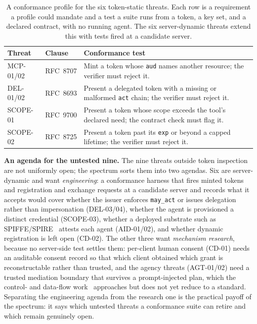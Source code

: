 \begin{table}[t]
\centering\footnotesize
\caption{A conformance profile for the six token-static threats. Each row is a
requirement a profile could mandate and a test a suite runs from a token, a key set,
and a declared contract, with no running agent. The six server-dynamic threats extend
this with tests fired at a candidate server.}
\label{tab:conformance}
\begin{tabular}{@{}llp{3.3cm}@{}}
\toprule
Threat & Clause & Conformance test \\
\midrule
MCP-01/02 & RFC~8707 & Mint a token whose \texttt{aud} names another resource; the
verifier must reject it. \\
DEL-01/02 & RFC~8693 & Present a delegated token with a missing or malformed
\texttt{act} chain; the verifier must reject it. \\
SCOPE-01 & RFC~9700 & Present a token whose scope exceeds the tool's declared need;
the contract check must flag it. \\
SCOPE-02 & RFC~8725 & Present a token past its \texttt{exp} or beyond a capped
lifetime; the verifier must reject it. \\
\bottomrule
\end{tabular}
\end{table}

\noindent\textbf{An agenda for the untested nine.} The nine threats outside token
inspection are not uniformly open; the spectrum sorts them into two agendas. Six are
server-dynamic and want \emph{engineering}: a conformance harness that fires minted
tokens and registration and exchange requests at a candidate server and records what
it accepts would cover whether the issuer enforces \texttt{may\_act} or issues
delegation rather than impersonation (DEL-03/04), whether the agent is provisioned a
distinct credential (SCOPE-03), whether a deployed substrate such as
SPIFFE/SPIRE~\cite{agentauth2026ldp} attests each agent (AID-01/02), and whether
dynamic registration is left open (CD-02). The other three want \emph{mechanism
research}, because no server-side test settles them: per-client human consent (CD-01)
needs an auditable consent record so that which client obtained which grant is
reconstructable rather than trusted, and the agency threats (AGT-01/02) need a trusted
mediation boundary that survives a prompt-injected plan, which the control- and
data-flow work~\cite{agentauth2025camel} approaches but does not yet reduce to a
standard. Separating the engineering agenda from the research one is the practical
payoff of the spectrum: it says which untested threats a conformance suite can retire
and which remain genuinely open.

